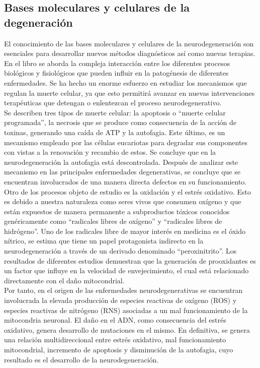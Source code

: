 \subsection{Bases moleculares y celulares de la degeneración}

El conocimiento de las bases moleculares y celulares de la neurodegeneración son esenciales para desarrollar nuevos métodos diagnósticos así como nuevas terapias. En el libro se aborda la compleja interacción entre los diferentes procesos biológicos y fisiológicos que pueden influir en la patogénesis de diferentes enfermedades. Se ha hecho un enorme esfuerzo en estudiar los mecanismos que regulan la muerte celular, ya que esto permitirá avanzar en nuevas intervenciones terapéuticas que detengan o enlentezcan el proceso neurodegenerativo.\\

Se describen tres tipos de muerte celular: la apoptosis o “muerte celular programada”, la necrosis que se produce como consecuencia de la acción de toxinas, generando una caída de ATP y la autofagia. Este último, es un mecanismo empleado por las células eucariotas para degradar sus componentes con vistas a la renovación y recambio de estos. Se concluye que en la neurodegeneración la autofagia está descontrolada. Después de analizar este mecanismo en las principales enfermedades degenerativas, se concluye que se encuentran involucrados de una manera directa defectos en su funcionamiento.\\

Otro de los procesos objeto de estudio es la oxidación y el estrés oxidativo. Esto es debido a nuestra naturaleza como seres vivos que consumen oxígeno y que están expuestos de manera permanente a subproductos tóxicos conocidos genéricamente como  “radicales libres de oxígeno” y “radicales libres de hidrógeno”. Uno de los radicales libre de mayor interés en medicina es el óxido nítrico, se estima que tiene un papel protagonista indirecto en la neurodegeneración a través de un derivado denominado “peroxinitrito”. Los resultados de diferentes estudios demuestran que la generación de prooxidantes es un factor que influye en la velocidad de envejecimiento, el cual está relacionado directamente con el daño mitocondrial.\\

Por tanto, en el origen de las enfermedades neurodegenerativas se encuentran involucrada la elevada producción de especies reactivas de oxígeno (ROS) y especies reactivas de nitrógeno (RNS) asociadas a un mal funcionamiento de la mitocondria neuronal. El daño en el ADN, como consecuencia del estrés oxidativo, genera desarrollo de mutaciones en el mismo. En definitiva, se genera una relación multidireccional entre estrés oxidativo, mal funcionamiento mitocondrial, incremento de apoptosis y disminución de la autofagia, cuyo resultado es el desarrollo de la neurodegeneración.\\

